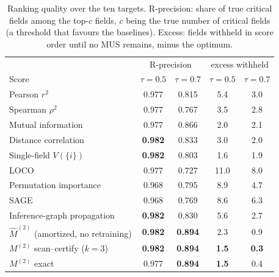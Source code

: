 \begin{table}[!tbp]
\centering\small
\caption{Ranking quality over the ten targets. R-precision: share of true critical fields among the top-$c$ fields, $c$ being
the true number of critical fields (a threshold that favours the baselines). Excess: fields withheld in score order until no
MUS remains, minus the optimum.}\label{tab:ranking}
\begin{tabular}{lcccc}
\toprule
 & \multicolumn{2}{c}{R-precision} & \multicolumn{2}{c}{excess withheld}\\
Score & $\tau=0.5$ & $\tau=0.7$ & $\tau=0.5$ & $\tau=0.7$\\
\midrule
Pearson $r^2$ & 0.977 & 0.815 & 5.4 & 3.0 \\
Spearman $\rho^2$ & 0.977 & 0.767 & 3.5 & 2.8 \\
Mutual information & 0.977 & 0.866 & 2.0 & 2.1 \\
Distance correlation & \textbf{0.982} & 0.833 & 3.0 & 2.0 \\
Single-field $V(\{i\})$ & \textbf{0.982} & 0.803 & 1.6 & 1.9 \\
LOCO & 0.977 & 0.727 & 11.0 & 8.0 \\
Permutation importance & 0.968 & 0.795 & 8.9 & 4.7 \\
SAGE & 0.968 & 0.769 & 8.6 & 6.3 \\
Inference-graph propagation & \textbf{0.982} & 0.830 & 5.6 & 2.7 \\
$\hat M^{(2)}$ (amortized, no retraining) & \textbf{0.982} & \textbf{0.894} & 2.3 & 0.9 \\
$M^{(2)}$ scan--certify ($k=3$) & \textbf{0.982} & \textbf{0.894} & \textbf{1.5} & \textbf{0.3} \\
$M^{(2)}$ exact & 0.977 & \textbf{0.894} & \textbf{1.5} & 0.4 \\
\bottomrule
\end{tabular}
\end{table}

